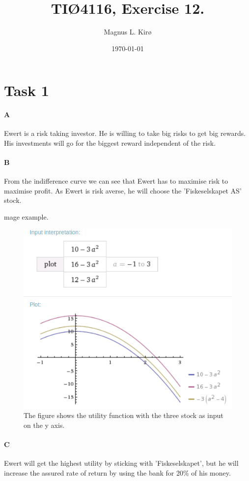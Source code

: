\documentclass[12pt, a4paper]{article}
\title{
	TIØ4116, Exercise 12. 
}
\author{
	Magnus L. Kirø \\
}
\date{\today}
\begin{document}
\maketitle
{}

\section{Task 1}

\paragraph{A}
Ewert is a risk taking investor. He is willing to take big risks to get big
rewards. His investments will go for the biggest reward independent of the
risk. 

\paragraph{B}
From the indifference curve we can see that Ewert has to maximise risk to
maximise profit. As Ewert is risk averse, he will choose the 'Fiskeselskapet
AS' stock. 


mage example. 
\begin{figure}[htb]
    \centering
    \includegraphics[width=\textwidth]{plot} 
    \label{fig:plot}
The figure shows the utility function with the three stock as input on the y
axis. 
\end{figure}

\paragraph{C}
Ewert will get the highest utility by sticking with 'Fiskeselskapet', but he
will increase the assured rate of return by using the bank for 20\% of his
money. 
\end{document}
